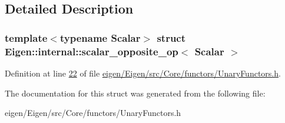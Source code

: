 \subsection{Detailed Description}
\subsubsection*{template$<$typename Scalar$>$\newline
struct Eigen\+::internal\+::scalar\+\_\+opposite\+\_\+op$<$ Scalar $>$}



Definition at line \hyperlink{eigen_2_eigen_2src_2_core_2functors_2_unary_functors_8h_source_l00022}{22} of file \hyperlink{eigen_2_eigen_2src_2_core_2functors_2_unary_functors_8h_source}{eigen/\+Eigen/src/\+Core/functors/\+Unary\+Functors.\+h}.



The documentation for this struct was generated from the following file\+:\begin{DoxyCompactItemize}
\item 
eigen/\+Eigen/src/\+Core/functors/\+Unary\+Functors.\+h\end{DoxyCompactItemize}
